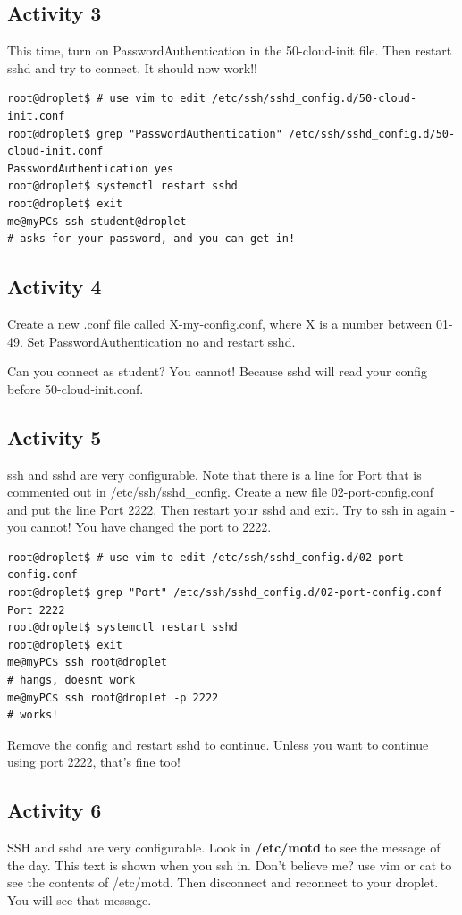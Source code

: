 \documentclass[12pt]{article}
\begin{document}
\subsection{Activity 3}
This time, turn on PasswordAuthentication in the 50-cloud-init file.
Then restart sshd and try to connect. It should now work!!

\begin{lstlisting}[style=term]
root@droplet$ # use vim to edit /etc/ssh/sshd_config.d/50-cloud-init.conf
root@droplet$ grep "PasswordAuthentication" /etc/ssh/sshd_config.d/50-cloud-init.conf
PasswordAuthentication yes
root@droplet$ systemctl restart sshd
root@droplet$ exit
me@myPC$ ssh student@droplet
# asks for your password, and you can get in!
\end{lstlisting}

\subsection{Activity 4}
Create a new .conf file called X-my-config.conf, where X is a number between 01-49.
Set PasswordAuthentication no and restart sshd. 

Can you connect as student? You cannot! Because sshd will read your config before 50-cloud-init.conf.

\subsection{Activity 5}
ssh and sshd are very configurable. Note that there is a line for Port that is commented out in /etc/ssh/sshd\_config. Create a new file 02-port-config.conf and put the line  Port 2222. Then restart your sshd and exit. Try to ssh in again - you cannot! You have changed the port to 2222. 
\begin{lstlisting}[style=term]
root@droplet$ # use vim to edit /etc/ssh/sshd_config.d/02-port-config.conf
root@droplet$ grep "Port" /etc/ssh/sshd_config.d/02-port-config.conf
Port 2222
root@droplet$ systemctl restart sshd
root@droplet$ exit
me@myPC$ ssh root@droplet
# hangs, doesnt work
me@myPC$ ssh root@droplet -p 2222
# works!
\end{lstlisting}

 Remove the config and restart sshd to continue. Unless you want to continue using port 2222, that's fine too!

\subsection{Activity 6}
SSH and sshd are very configurable. Look in \textbf{/etc/motd} to see the message of the day. This text is shown when you ssh in. Don't believe me? use vim or cat to see the contents of /etc/motd. Then disconnect and reconnect to your droplet. You will see that message.
\end{document}
